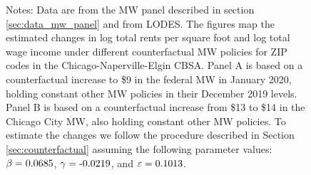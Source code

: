 \begin{figure}[h!]
    \begin{minipage}{.95\textwidth} \footnotesize
        \vspace{2.5mm}
        Notes: 
        Data are from the MW panel described in section \ref{sec:data_mw_panel} 
        and from LODES.
        The figures map the estimated changes in log total rents per square foot
        and log total wage income under different counterfactual MW policies for 
        ZIP codes in the Chicago-Naperville-Elgin CBSA.
        Panel A is based on a counterfactual increase to \$9 in the 
        federal MW in January 2020, holding constant other MW policies in their 
        December 2019 levels.
        Panel B is based on a counterfactual increase from \$13 to \$14 in the 
        Chicago City MW, also holding constant other MW policies.
        To estimate the changes we follow the procedure described in Section 
        \ref{sec:counterfactual} assuming the following parameter values: 
        $\beta = \textnormal{0.0685}$, $\gamma = \textnormal{-0.0219}$, and $\varepsilon = \textnormal{0.1013}$.
    \end{minipage}
\end{figure}
